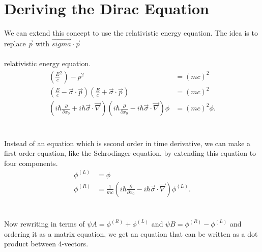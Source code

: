 \documentclass{report}
\begin{document}
\section{Deriving the Dirac Equation}
We can extend this concept to use the relativistic energy equation. The idea is to replace $\vec{p}$ with $\displaystyle \vec{sigma} \cdot \vec{p}$ \\ \\
relativistic energy equation.
\begin{align*}
	\left( \frac{E}{c}^2 \right) -p^2                                                                                                                                                                          & =\left( mc \right) ^2       \\
	\left( \frac{E}{c}-\vec{\sigma}\cdot \vec{p} \right) \left( \frac{E}{c} + \vec{\sigma} \cdot \vec{p} \right)                                                                                               & = \left( mc \right) ^2      \\
	\left( i \hbar \frac{ \partial }{ \partial x_0 } + i \hbar \vec{\sigma} \cdot \vec{\nabla} \right) \left( i \hbar \frac{ \partial }{ \partial x_0 } - i \hbar \vec{\sigma} \cdot \vec{\nabla} \right) \phi & = \left( mc \right) ^2 \phi
	.\end{align*} \\ \\
Instead of an equation which is second order in time derivative, we can make a first order equation, like the Schrodinger equation, by extending this equation to four components.
\begin{align*}
	\phi^{(L)} & = \phi                                                                                                                      \\
	\phi^{(R)} & = \frac{1}{mc}\left( i \hbar \frac{ \partial }{ \partial x_0 } - i \hbar \vec{\sigma} \cdot \vec{\nabla} \right) \phi^{(L)}
	.\end{align*}\\ \\
Now rewriting in terms of $\displaystyle \psi A = \phi^{(R)} + \phi^{(L)}$ and $\displaystyle \psi B = \phi^{(R)} - \phi^{(L)}$ and ordering it as a matrix equation, we get an equation that can be written as a dot product between 4-vectors. \\ \\
\end{document}
